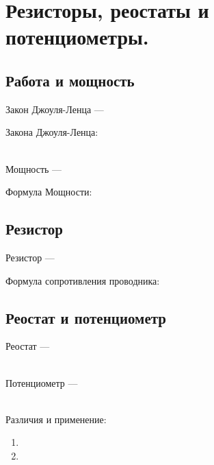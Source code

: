 \section{Резисторы, реостаты и потенциометры.}


\subsection{Работа и мощность}

Закон Джоуля-Ленца --- \hrulefill

\hrulefill

\hrulefill

Закона Джоуля-Ленца:

\\
Мощность --- \hrulefill

\hrulefill

\hrulefill

Формула Мощности:


\subsection{Резистор}

Резистор --- \hrulefill

\hrulefill

\hrulefill

Формула сопротивления проводника:

 
\subsection{Реостат и потенциометр}

Реостат --- \hrulefill%

\hrulefill
\\
Потенциометр --- \hrulefill %

\hrulefill
\\
Различия и применение:
\begin{enumerate}
\item  \hrulefill

\hrulefill
\item \hrulefill 

\hrulefill
\end{enumerate}

